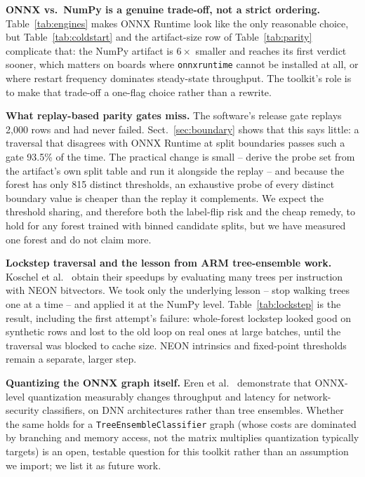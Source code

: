 \documentclass[runningheads]{llncs}
\begin{document}
\textbf{ONNX vs.\ NumPy is a genuine trade-off, not a strict ordering.} Table~\ref{tab:engines} makes ONNX Runtime look like the only reasonable choice, but Table~\ref{tab:coldstart} and the artifact-size row of Table~\ref{tab:parity} complicate that: the NumPy artifact is $6\times$ smaller and reaches its first verdict sooner, which matters on boards where \texttt{onnxruntime} cannot be installed at all, or where restart frequency dominates steady-state throughput. The toolkit's role is to make that trade-off a one-flag choice rather than a rewrite.

\textbf{What replay-based parity gates miss.} The software's release gate replays 2{,}000 rows and had never failed. Sect.~\ref{sec:boundary} shows that this says little: a traversal that disagrees with ONNX Runtime at split boundaries passes such a gate 93.5\% of the time. The practical change is small -- derive the probe set from the artifact's own split table and run it alongside the replay -- and because the forest has only 815 distinct thresholds, an exhaustive probe of every distinct boundary value is cheaper than the replay it complements. We expect the threshold sharing, and therefore both the label-flip risk and the cheap remedy, to hold for any forest trained with binned candidate splits, but we have measured one forest and do not claim more.

\textbf{Lockstep traversal and the lesson from ARM tree-ensemble work.} Koschel et al.~\cite{koschel2023arm} obtain their speedups by evaluating many trees per instruction with NEON bitvectors. We took only the underlying lesson -- stop walking trees one at a time -- and applied it at the NumPy level. Table~\ref{tab:lockstep} is the result, including the first attempt's failure: whole-forest lockstep looked good on synthetic rows and lost to the old loop on real ones at large batches, until the traversal was blocked to cache size. NEON intrinsics and fixed-point thresholds remain a separate, larger step.

\textbf{Quantizing the ONNX graph itself.} Eren et al.~\cite{eren2026drdos} demonstrate that ONNX-level quantization measurably changes throughput and latency for network-security classifiers, on DNN architectures rather than tree ensembles. Whether the same holds for a \texttt{TreeEnsembleClassifier} graph (whose costs are dominated by branching and memory access, not the matrix multiplies quantization typically targets) is an open, testable question for this toolkit rather than an assumption we import; we list it as future work.
\end{document}
